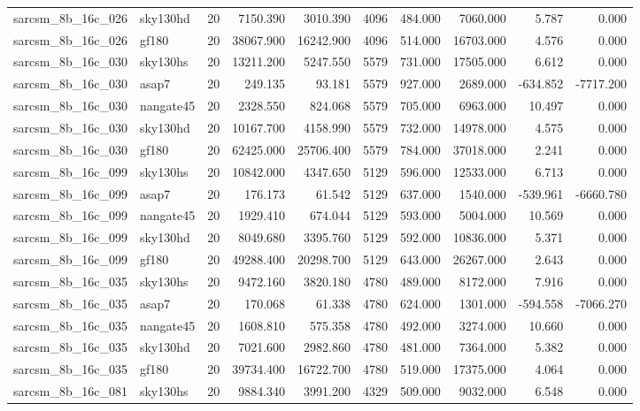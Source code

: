 \begin{longtable}{llrrrrrrrr}
sarcsm\_8b\_16c\_026 & sky130hd & 20 & 7150.390 & 3010.390 & 4096 & 484.000 & 7060.000 & 5.787 & 0.000 \\
sarcsm\_8b\_16c\_026 & gf180 & 20 & 38067.900 & 16242.900 & 4096 & 514.000 & 16703.000 & 4.576 & 0.000 \\
sarcsm\_8b\_16c\_030 & sky130hs & 20 & 13211.200 & 5247.550 & 5579 & 731.000 & 17505.000 & 6.612 & 0.000 \\
sarcsm\_8b\_16c\_030 & asap7 & 20 & 249.135 & 93.181 & 5579 & 927.000 & 2689.000 & -634.852 & -7717.200 \\
sarcsm\_8b\_16c\_030 & nangate45 & 20 & 2328.550 & 824.068 & 5579 & 705.000 & 6963.000 & 10.497 & 0.000 \\
sarcsm\_8b\_16c\_030 & sky130hd & 20 & 10167.700 & 4158.990 & 5579 & 732.000 & 14978.000 & 4.575 & 0.000 \\
sarcsm\_8b\_16c\_030 & gf180 & 20 & 62425.000 & 25706.400 & 5579 & 784.000 & 37018.000 & 2.241 & 0.000 \\
sarcsm\_8b\_16c\_099 & sky130hs & 20 & 10842.000 & 4347.650 & 5129 & 596.000 & 12533.000 & 6.713 & 0.000 \\
sarcsm\_8b\_16c\_099 & asap7 & 20 & 176.173 & 61.542 & 5129 & 637.000 & 1540.000 & -539.961 & -6660.780 \\
sarcsm\_8b\_16c\_099 & nangate45 & 20 & 1929.410 & 674.044 & 5129 & 593.000 & 5004.000 & 10.569 & 0.000 \\
sarcsm\_8b\_16c\_099 & sky130hd & 20 & 8049.680 & 3395.760 & 5129 & 592.000 & 10836.000 & 5.371 & 0.000 \\
sarcsm\_8b\_16c\_099 & gf180 & 20 & 49288.400 & 20298.700 & 5129 & 643.000 & 26267.000 & 2.643 & 0.000 \\
sarcsm\_8b\_16c\_035 & sky130hs & 20 & 9472.160 & 3820.180 & 4780 & 489.000 & 8172.000 & 7.916 & 0.000 \\
sarcsm\_8b\_16c\_035 & asap7 & 20 & 170.068 & 61.338 & 4780 & 624.000 & 1301.000 & -594.558 & -7066.270 \\
sarcsm\_8b\_16c\_035 & nangate45 & 20 & 1608.810 & 575.358 & 4780 & 492.000 & 3274.000 & 10.660 & 0.000 \\
sarcsm\_8b\_16c\_035 & sky130hd & 20 & 7021.600 & 2982.860 & 4780 & 481.000 & 7364.000 & 5.382 & 0.000 \\
sarcsm\_8b\_16c\_035 & gf180 & 20 & 39734.400 & 16722.700 & 4780 & 519.000 & 17375.000 & 4.064 & 0.000 \\
sarcsm\_8b\_16c\_081 & sky130hs & 20 & 9884.340 & 3991.200 & 4329 & 509.000 & 9032.000 & 6.548 & 0.000 \\

\end{longtable}
